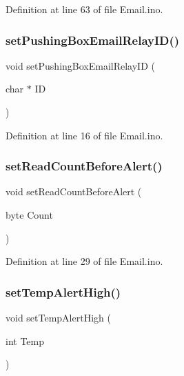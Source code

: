 Definition at line 63 of file Email.\+ino.

\mbox{\label{_email_8ino_a5c41da8d97d4a12c185f295c80b31b45}} 
\subsubsection{\texorpdfstring{setPushingBoxEmailRelayID()}{setPushingBoxEmailRelayID()}}
{\footnotesize\ttfamily void set\+Pushing\+Box\+Email\+Relay\+ID (\begin{DoxyParamCaption}\item[{char $\ast$}]{ID }\end{DoxyParamCaption})}



Definition at line 16 of file Email.\+ino.

\mbox{\label{_email_8ino_aaa6f2f12207e4270127859a5a5d32f71}} 
\subsubsection{\texorpdfstring{setReadCountBeforeAlert()}{setReadCountBeforeAlert()}}
{\footnotesize\ttfamily void set\+Read\+Count\+Before\+Alert (\begin{DoxyParamCaption}\item[{byte}]{Count }\end{DoxyParamCaption})}



Definition at line 29 of file Email.\+ino.

\mbox{\label{_email_8ino_a0c7236ef6bd0246425bb4411533f6283}} 
\subsubsection{\texorpdfstring{setTempAlertHigh()}{setTempAlertHigh()}}
{\footnotesize\ttfamily void set\+Temp\+Alert\+High (\begin{DoxyParamCaption}\item[{int}]{Temp }\end{DoxyParamCaption})}



